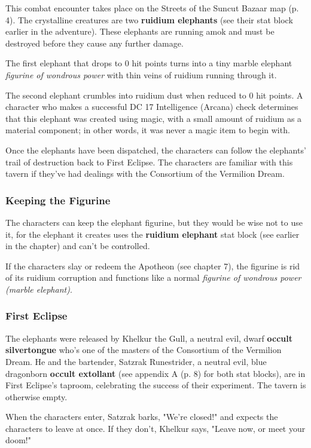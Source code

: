\documentclass[a4paper, 11pt, bg=full, twocolumn, nooutline]{dndbook}
\begin{document}
This combat encounter takes place on the Streets of the Suncut Bazaar map (p. 4). The crystalline creatures are two \textbf{ruidium elephants} (see their stat block earlier in the adventure). These elephants are running amok and must be destroyed before they cause any further damage.

The first elephant that drops to 0 hit points turns into a tiny marble elephant \textit{figurine of wondrous power} with thin veins of ruidium running through it.

The second elephant crumbles into ruidium dust when reduced to 0 hit points. A character who makes a successful DC 17 Intelligence (Arcana) check determines that this elephant was created using magic, with a small amount of ruidium as a material component; in other words, it was never a magic item to begin with.

Once the elephants have been dispatched, the characters can follow the elephants' trail of destruction back to First Eclipse. The characters are familiar with this tavern if they've had dealings with the Consortium of the Vermilion Dream.

\subsubsection{Keeping the Figurine}

The characters can keep the elephant figurine, but they would be wise not to use it, for the elephant it creates uses the \textbf{ruidium elephant} stat block (see earlier in the chapter) and can't be controlled.

If the characters slay or redeem the Apotheon (see chapter 7), the figurine is rid of its ruidium corruption and functions like a normal \textit{figurine of wondrous power (marble elephant)}.

\subsubsection{First Eclipse}

The elephants were released by Khelkur the Gull, a neutral evil, dwarf \textbf{occult silvertongue} who's one of the masters of the Consortium of the Vermilion Dream. He and the bartender, Satzrak Runestrider, a neutral evil, blue dragonborn \textbf{occult extollant} (see appendix A (p. 8) for both stat blocks), are in First Eclipse's taproom, celebrating the success of their experiment. The tavern is otherwise empty.

When the characters enter, Satzrak barks, "We're closed!" and expects the characters to leave at once. If they don't, Khelkur says, "Leave now, or meet your doom!"
\end{document}
